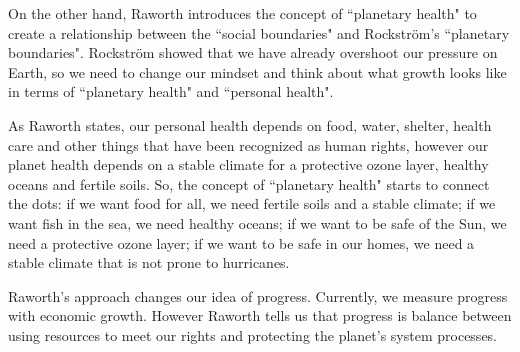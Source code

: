 \documentclass[11pt,a4paper]{article}
\begin{document}
On the other hand, Raworth introduces the concept of ``planetary health" to create a relationship between the ``social boundaries" and Rockström's ``planetary boundaries". Rockström showed that we have already overshoot our pressure on Earth, so we need to change our mindset and think about what growth looks like in terms of ``planetary health" and ``personal health". \parencite{Raworth2012}

As Raworth states, our personal health depends on food, water, shelter, health care and other things that have been recognized as human rights, however our planet health depends on a stable climate for a protective ozone layer, healthy oceans and fertile soils. So, the concept of ``planetary health" starts to connect the dots: if we want food for all, we need fertile soils and a stable climate; if we want fish in the sea, we need healthy oceans; if we want to be safe of the Sun, we need a protective ozone layer; if we want to be safe in our homes, we need a stable climate that is not prone to hurricanes. \parencite{Raworth2012}

Raworth's approach changes our idea of progress. Currently, we measure progress with economic growth. However Raworth tells us that progress is balance between using resources to meet our rights and protecting the planet's system processes.


\clearpage
\printbibliography

\end{document}
